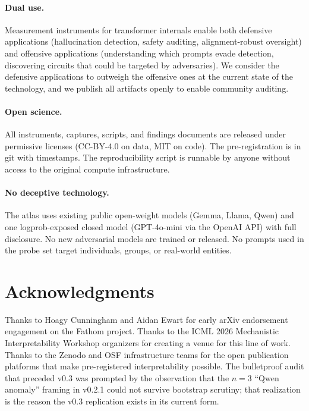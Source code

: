 \documentclass[11pt,letterpaper]{article}
\begin{document}
\paragraph{Dual use.} Measurement instruments for transformer internals
enable both defensive applications (hallucination detection, safety
auditing, alignment-robust oversight) and offensive applications
(understanding which prompts evade detection, discovering circuits that
could be targeted by adversaries). We consider the defensive applications
to outweigh the offensive ones at the current state of the technology,
and we publish all artifacts openly to enable community auditing.

\paragraph{Open science.} All instruments, captures, scripts, and findings
documents are released under permissive licenses
(CC-BY-4.0 on data, MIT on code). The pre-registration is in git with
timestamps. The reproducibility script is runnable by anyone without
access to the original compute infrastructure.

\paragraph{No deceptive technology.} The atlas uses existing public
open-weight models (Gemma, Llama, Qwen) and one logprob-exposed closed
model (GPT-4o-mini via the OpenAI API) with full disclosure. No new
adversarial models are trained or released. No prompts used in the probe
set target individuals, groups, or real-world entities.

\section*{Acknowledgments}

Thanks to Hoagy Cunningham and Aidan Ewart for early arXiv endorsement
engagement on the Fathom project. Thanks to the ICML 2026 Mechanistic
Interpretability Workshop organizers for creating a venue for this line
of work. Thanks to the Zenodo and OSF infrastructure teams for the open
publication platforms that make pre-registered interpretability possible.
The bulletproof audit that preceded v0.3 was prompted by the observation
that the $n\!=\!3$ ``Qwen anomaly'' framing in v0.2.1 could not survive
bootstrap scrutiny; that realization is the reason the v0.3 replication
exists in its current form.
\end{document}
